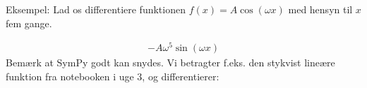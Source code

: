 \documentclass[letterpaper,10pt,english]{jupyterBook}
\begin{document}
Eksempel: Lad os differentiere funktionen \(f(x) = A \cos(\omega x)\) med hensyn til \(x\) fem gange.

\begin{sphinxVerbatim}[commandchars=\\\{\}]
            
         
\end{sphinxVerbatim}
\begin{equation*}
\begin{split}\displaystyle - A \omega^{5} \sin{\left(\omega x \right)}\end{split}
\end{equation*}
Bemærk at SymPy godt kan snydes. Vi betragter f.eks. den stykvist lineære funktion fra notebooken i uge 3, og differentierer:
\end{document}
